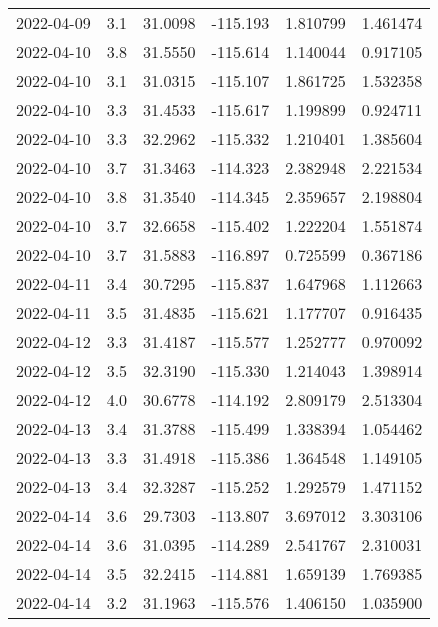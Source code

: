 \begin{tabular}{lrrrrr}
2022-04-09 &       3.1 &  31.0098 &  -115.193 &         1.810799 &         1.461474 \\
2022-04-10 &       3.8 &  31.5550 &  -115.614 &         1.140044 &         0.917105 \\
2022-04-10 &       3.1 &  31.0315 &  -115.107 &         1.861725 &         1.532358 \\
2022-04-10 &       3.3 &  31.4533 &  -115.617 &         1.199899 &         0.924711 \\
2022-04-10 &       3.3 &  32.2962 &  -115.332 &         1.210401 &         1.385604 \\
2022-04-10 &       3.7 &  31.3463 &  -114.323 &         2.382948 &         2.221534 \\
2022-04-10 &       3.8 &  31.3540 &  -114.345 &         2.359657 &         2.198804 \\
2022-04-10 &       3.7 &  32.6658 &  -115.402 &         1.222204 &         1.551874 \\
2022-04-10 &       3.7 &  31.5883 &  -116.897 &         0.725599 &         0.367186 \\
2022-04-11 &       3.4 &  30.7295 &  -115.837 &         1.647968 &         1.112663 \\
2022-04-11 &       3.5 &  31.4835 &  -115.621 &         1.177707 &         0.916435 \\
2022-04-12 &       3.3 &  31.4187 &  -115.577 &         1.252777 &         0.970092 \\
2022-04-12 &       3.5 &  32.3190 &  -115.330 &         1.214043 &         1.398914 \\
2022-04-12 &       4.0 &  30.6778 &  -114.192 &         2.809179 &         2.513304 \\
2022-04-13 &       3.4 &  31.3788 &  -115.499 &         1.338394 &         1.054462 \\
2022-04-13 &       3.3 &  31.4918 &  -115.386 &         1.364548 &         1.149105 \\
2022-04-13 &       3.4 &  32.3287 &  -115.252 &         1.292579 &         1.471152 \\
2022-04-14 &       3.6 &  29.7303 &  -113.807 &         3.697012 &         3.303106 \\
2022-04-14 &       3.6 &  31.0395 &  -114.289 &         2.541767 &         2.310031 \\
2022-04-14 &       3.5 &  32.2415 &  -114.881 &         1.659139 &         1.769385 \\
2022-04-14 &       3.2 &  31.1963 &  -115.576 &         1.406150 &         1.035900 \\

\end{tabular}

